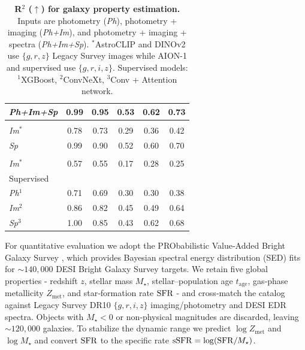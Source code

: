 \documentclass[]{polymathic}
\begin{document}
\begin{table}
\begin{tabular}{l
                c  %
                c  %
                c  %
                c  %
                c  %
               }
\hspace{1mm}\textit{Ph+Im+Sp}      & 0.99 & 0.95 & 0.53 & 0.62 & 0.73 \\
\midrule
\cite{Parker2024} & & & & & \\
\hspace{1mm}\textit{Im}$^{*}$      & 0.78 & 0.73 & 0.29 & 0.36 & 0.42 \\
\hspace{1mm}\textit{Sp}            & 0.99 & 0.90 & 0.52 & 0.60 & 0.70 \\[2pt]
\cite{oquab2023dinov2} & & & & & \\
\hspace{1mm}\textit{Im}$^{*}$      & 0.57 & 0.55 & 0.17 & 0.28 & 0.25 \\
\midrule
Supervised & & & & & \\
\hspace{1mm}\textit{Ph}$^{1}$      & 0.71 & 0.69 & 0.30 & 0.30 & 0.38 \\
\hspace{1mm}\textit{Im}$^{2}$      & 0.86 & 0.82 & 0.45 & 0.49 & 0.64 \\
\hspace{1mm}\textit{Sp}$^{3}$      & 1.00 & 0.85 & 0.43 & 0.62 & 0.68 \\
\bottomrule
\end{tabular}
\caption{\textbf{R$^2$ ($\uparrow$) for galaxy property estimation.}  
Inputs are photometry (\textit{Ph}), photometry + imaging (\textit{Ph+Im}), and photometry + imaging + spectra (\textit{Ph+Im+Sp}).  
$^{*}$AstroCLIP and DINOv2 use $\{g,r,z\}$ Legacy Survey images while AION-1 and supervised use $\{g,r,i,z\}$.  
Supervised models: $^{1}$XGBoost, $^{2}$ConvNeXt, $^{3}$Conv + Attention network.}
\label{tab:galaxy_properties_full}
\end{table}


For quantitative evaluation we adopt the PRObabilistic Value‐Added Bright Galaxy Survey \citep[PROVABGS;][]{hahn2023desi}, which provides Bayesian spectral energy distribution (SED) fits for $\sim 140,000$ DESI Bright Galaxy Survey targets. We retain five global properties - redshift $z$, stellar mass $M_{\star}$, stellar–population age $t_{\mathrm{age}}$, gas‐phase metallicity $Z_{\mathrm{met}}$, and star‐formation rate ${\rm SFR}$ - and cross‑match the catalog against Legacy Survey DR10 $\{g,r,i,z\}$ imaging/photometry and DESI EDR spectra. Objects with $M_{\star}<0$ or non‐physical magnitudes are discarded, leaving $\sim 120,000$ galaxies. To stabilize the dynamic range we predict $\log Z_{\mathrm{met}}$ and $\log M_{\star}$ and convert ${\rm SFR}$ to the specific rate ${\rm sSFR}=\log({\rm SFR}/M_{\star})$.
\end{document}
